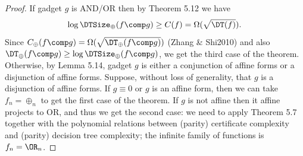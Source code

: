\begin{proof}
If gadget $g$ is AND/OR then by Theorem 5.12 we have
\[\log\DTSize_\oplus(f\comp g)\ge C(f)=\Omega(\sqrt{\DT(f)}).\]
Since $C_\oplus(f\comp g)=\Omega(\sqrt{\DT_\oplus(f\comp g)})$ (Zhang \& Shi2010) and also $\DT_\oplus(f\comp g)\ge\log\DTSize_\oplus(f\comp g)$, we get the third case of the theorem.
Otherwise, by Lemma 5.14, gadget $g$ is either a conjunction of affine forms or a disjunction of affine forms. Suppose, without loss of generality, that $g$ is a disjunction of affine forms. If $g\equiv0$ or $g$ is an affine form, then we can take $f_n=\oplus_n$ to get the first case of the theorem. If $g$ is not affine then it affine projects to OR, and thus we get the second case: we need to apply Theorem 5.7 together with the polynomial relations between (parity) certificate complexity and (parity) decision tree complexity; the infinite family of functions is $f_n=\OR_n$.
\end{proof}
